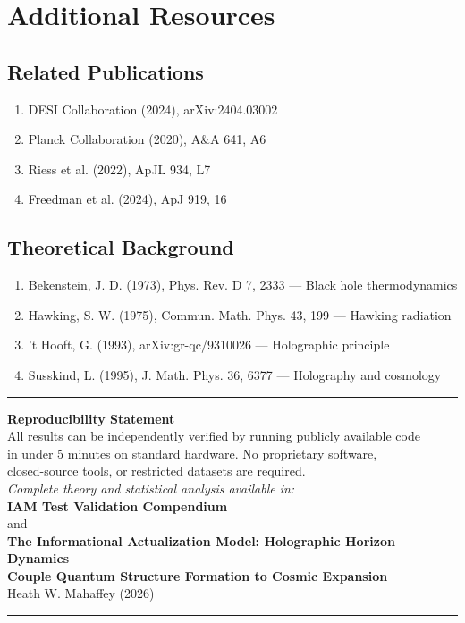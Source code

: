 \documentclass[11pt]{article}
\begin{document}
\section{Additional Resources}

\subsection{Related Publications}

\begin{enumerate}
    \item DESI Collaboration (2024), arXiv:2404.03002
    \item Planck Collaboration (2020), A\&A 641, A6
    \item Riess et al. (2022), ApJL 934, L7
    \item Freedman et al. (2024), ApJ 919, 16
\end{enumerate}

\subsection{Theoretical Background}

\begin{enumerate}
    \item Bekenstein, J. D. (1973), Phys. Rev. D 7, 2333 — Black hole thermodynamics
    \item Hawking, S. W. (1975), Commun. Math. Phys. 43, 199 — Hawking radiation
    \item 't Hooft, G. (1993), arXiv:gr-qc/9310026 — Holographic principle
    \item Susskind, L. (1995), J. Math. Phys. 36, 6377 — Holography and cosmology
\end{enumerate}


\vfill

\noindent\rule{\textwidth}{0.4pt}

\begin{center}
\textbf{Reproducibility Statement} \\[0.5em]
All results can be independently verified by running publicly available code \\
in under 5 minutes on standard hardware. No proprietary software, \\
closed-source tools, or restricted datasets are required. \\[1em]

\textit{Complete theory and statistical analysis available in:} \\
\textbf{IAM Test Validation Compendium} \\
and \\
\textbf{The Informational Actualization Model: Holographic Horizon Dynamics} \\
\textbf{Couple Quantum Structure Formation to Cosmic Expansion} \\
Heath W. Mahaffey (2026)
\end{center}

\noindent\rule{\textwidth}{0.4pt}
\end{document}
